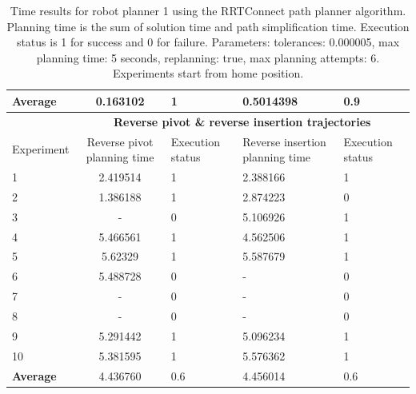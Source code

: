 \begin{table}[H]
\begin{tabular}{|p{2cm}|c|p{2cm}|p{2cm}|p{2cm}|}
\hline
\textbf{Average} & 	0.163102 & 1	& 0.5014398 &	0.9 \\
\hline
                          & \multicolumn{4}{c}{\textbf{Reverse pivot \& reverse insertion trajectories}}                     \vline \\
\hline
Experiment                & Reverse pivot planning time & Execution status & Reverse insertion planning time & Execution status  \\
\hline
1 & 2.419514	& 1	& 2.388166	& 1 \\
2 & 1.386188	& 1	& 2.874223	& 0 \\
3 & -	& 0	& 5.106926	& 1 \\
4 & 5.466561	& 1	& 4.562506	& 1 \\
5 & 5.62329	& 1	& 5.587679	& 1 \\
6 & 5.488728	& 0	& -	& 0 \\
7 & -	& 0	& -	& 0 \\
8 & -	& 0	& -	& 0 \\
9 & 5.291442	& 1	& 5.096234	& 1 \\
10 & 5.381595	& 1	& 5.576362	& 1 \\
\hline
\textbf{Average} & 	4.436760	& 0.6	& 4.456014	& 0.6 \\
\hline
\end{tabular}
\caption{Time results for robot planner 1 using the RRTConnect path planner algorithm. Planning time is the sum of solution time and path simplification time. Execution status is 
1 for success and 0 for failure. Parameters: tolerances: 0.000005, max planning time: 5 seconds, replanning: true, max planning attempts: 6. Experiments start from home position.}
\label{robot-planner1-rrtconnect-data}
\end{table}


